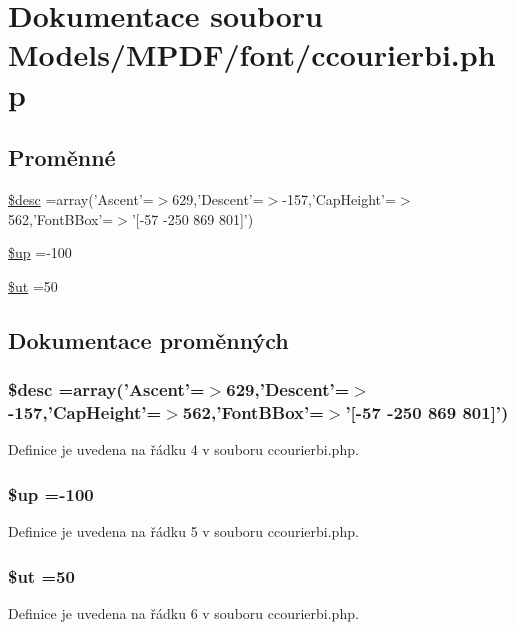 \hypertarget{ccourierbi_8php}{\section{Dokumentace souboru Models/\-M\-P\-D\-F/font/ccourierbi.php}
\label{ccourierbi_8php}
}
\subsection*{Proměnné}
\begin{DoxyCompactItemize}
\item 
\hyperlink{ccourierbi_8php_a31059b9e4d0c5af34df20da32232ea9a}{\$desc} =array('Ascent'=$>$629,'Descent'=$>$-\/157,'Cap\-Height'=$>$562,'Font\-B\-Box'=$>$'\mbox{[}-\/57 -\/250 869 801\mbox{]}')
\item 
\hyperlink{ccourierbi_8php_a6b5ad2ac55f9df46e8f34e78fbd6f176}{\$up} =-\/100
\item 
\hyperlink{ccourierbi_8php_aadd3f841051043ee58e587e840e8dd0b}{\$ut} =50
\end{DoxyCompactItemize}


\subsection{Dokumentace proměnných}
\hypertarget{ccourierbi_8php_a31059b9e4d0c5af34df20da32232ea9a}{
\subsubsection[{\$desc}]{\setlength{\rightskip}{0pt plus 5cm}\$desc =array('Ascent'=$>$629,'Descent'=$>$-\/157,'Cap\-Height'=$>$562,'Font\-B\-Box'=$>$'\mbox{[}-\/57 -\/250 869 801\mbox{]}')}}\label{ccourierbi_8php_a31059b9e4d0c5af34df20da32232ea9a}


Definice je uvedena na řádku 4 v souboru ccourierbi.\-php.

\hypertarget{ccourierbi_8php_a6b5ad2ac55f9df46e8f34e78fbd6f176}{
\subsubsection[{\$up}]{\setlength{\rightskip}{0pt plus 5cm}\$up =-\/100}}\label{ccourierbi_8php_a6b5ad2ac55f9df46e8f34e78fbd6f176}


Definice je uvedena na řádku 5 v souboru ccourierbi.\-php.

\hypertarget{ccourierbi_8php_aadd3f841051043ee58e587e840e8dd0b}{
\subsubsection[{\$ut}]{\setlength{\rightskip}{0pt plus 5cm}\$ut =50}}\label{ccourierbi_8php_aadd3f841051043ee58e587e840e8dd0b}


Definice je uvedena na řádku 6 v souboru ccourierbi.\-php.

